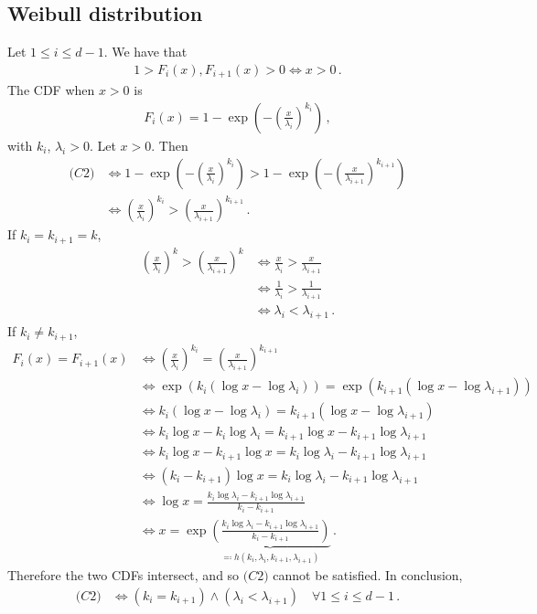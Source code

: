 \documentclass{article}
\begin{document}
\subsection*{Weibull distribution}
%
Let $1 \leq i \leq d - 1$. We have that
%
\begin{align*}
	1 > F_i(x), F_{i + 1}(x) > 0 \iff x > 0 \,.
\end{align*}
%
The CDF when $x > 0$ is
%
\begin{align*}
	F_i(x) = 1 - \exp\left(-\left(\frac{x}{\lambda_i}\right) ^ {k_i}\right) \,,
\end{align*}
%
with $k_i$, $\lambda_i > 0$. Let $ x> 0$. Then
%
\begin{align*}
	\textit{(C2)} & \iff 1 - \exp\left(-\left(\frac{x}{\lambda_i}\right)
		^ {k_i}\right) > 1- \exp\left(-\left(\frac{x}{\lambda_{i + 1}}\right)
		^ {k_{i + 1}}\right)\\
	&\iff \left(\frac{x}{\lambda_i}\right) ^ {k_i} >
		\left(\frac{x}{\lambda_{i + 1}}\right) ^ {k_{i + 1}} \,.
\end{align*}
%
If $k_i = k_{i + 1} = k$,
%
\begin{align*}
	\left(\frac{x}{\lambda_i}\right) ^ k
		> \left(\frac{x}{\lambda_{i + 1}}\right) ^ k&
		\iff \frac{x}{\lambda_i} > \frac{x}{\lambda_{i + 1}}\\
	&\iff \frac{1}{\lambda_i} > \frac{1}{\lambda_{i + 1}}\\
	&\iff \lambda_i < \lambda_{i + 1} \,.
\end{align*}
%
If $k_i \neq k_{i + 1}$,
%
\begin{align*}
	F_i(x) =F_{i + 1}(x)
		&\iff \left(\frac{x}{\lambda_i}\right) ^ {k_i}
		= \left(\frac{x}{\lambda_{i + 1}}\right) ^ {k_{i + 1}}\\
	&\iff \exp\left(k_i (\log x - \log\lambda_i)\right)
		=\exp\left({k_{i + 1}}(\log x - \log\lambda_{i + 1})\right)\\
	&\iff k_i (\log x - \log\lambda_i)
		= {k_{i + 1}} (\log x - \log\lambda_{i + 1})\\
	&\iff k_i \log x - k_i \log\lambda_i 
		= {k_{i + 1}} \log x - {k_{i + 1}} \log\lambda_{i + 1}\\
	&\iff k_i \log x - {k_{i + 1}} \log x
		=k_i \log\lambda_i - {k_{i + 1}} \log\lambda_{i + 1}\\
	&\iff (k_i - {k_{i + 1}}) \log x 
		= k_i \log\lambda_i - {k_{i + 1}} \log\lambda_{i + 1}\\
	&\iff \log x
		= \frac{k_i \log\lambda_i - {k_{i + 1}}
		\log\lambda_{i + 1}}{k_i - {k_{i + 1}}}\\
	&\iff x
		= \exp\underbrace{\left(\frac{k_i \log\lambda_i - {k_{i + 1}}
		\log\lambda_{i + 1}}{k_i - {k_{i + 1}}}\right)}
		_{\eqqcolon h(k_i, \lambda_i, k_{i + 1}, \lambda_{i + 1})} \,.
\end{align*}
%
Therefore the two CDFs intersect, and so $\textit{(C2)}$ cannot be satisfied.
In conclusion,
%
\begin{align*}
	\textit{(C2)}
		&\iff (k_i = k_{i + 1}) \land (\lambda_i < \lambda_{i + 1})
		\quad \forall 1 \leq i \leq d - 1 \,.
\end{align*}
%
\end{document}
